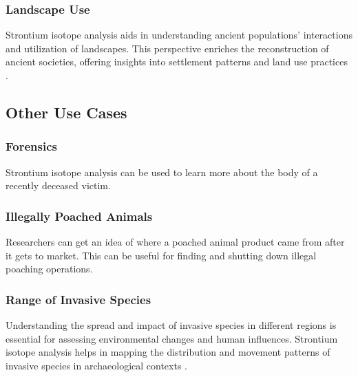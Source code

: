 \documentclass[a4paper, 12pt]{article}
\begin{document}
\subsubsection{Landscape Use}
Strontium isotope analysis aids in understanding ancient populations' interactions
and utilization of landscapes. This perspective enriches the reconstruction of
ancient societies, offering insights into settlement patterns and land use
practices \citep{crowley2017}.


\subsection{Other Use Cases}
\subsubsection{Forensics}
Strontium isotope analysis can be used to learn more about the body of a recently
deceased victim.

\subsubsection{Illegally Poached Animals}
Researchers can get an idea of where a poached animal product came from after it
gets to market. This can be useful for finding and shutting down illegal poaching
operations.

\subsubsection{Range of Invasive Species}
Understanding the spread and impact of invasive species in different regions is
essential for assessing environmental changes and human influences. Strontium
isotope analysis helps in mapping the distribution and movement patterns of
invasive species in archaeological contexts \citep{crowley2017}.




\end{document}
